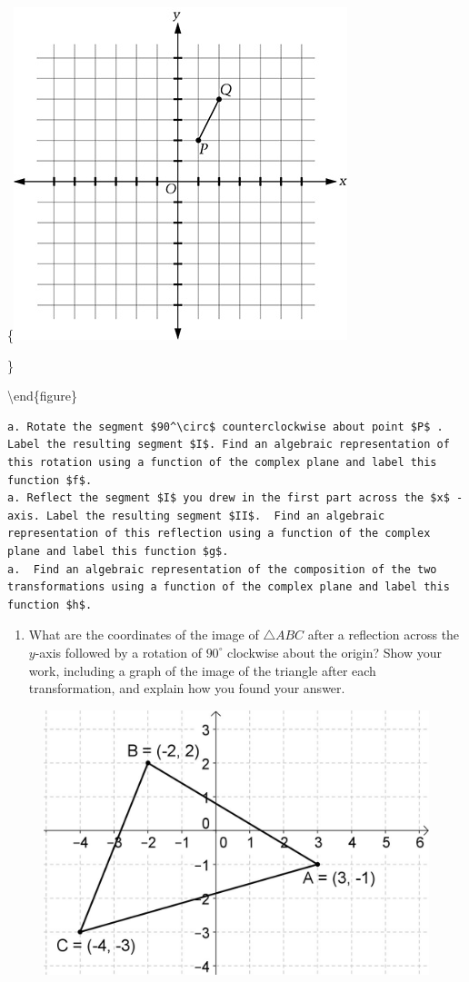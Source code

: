\documentclass[
]{book}
\providecommand{\tightlist}{%
  \setlength{\itemsep}{0pt}\setlength{\parskip}{0pt}}
\theoremstyle{definition}
\theoremstyle{definition}
\theoremstyle{definition}
\theoremstyle{definition}
\theoremstyle{remark}
\begin{document}
\{\centering \includegraphics[width=0.35\linewidth]{images/transformgraph}

\}

\textbackslash end\{figure\}

\begin{verbatim}
a. Rotate the segment $90^\circ$ counterclockwise about point $P$ . Label the resulting segment $I$. Find an algebraic representation of this rotation using a function of the complex plane and label this function $f$.
a. Reflect the segment $I$ you drew in the first part across the $x$ -axis. Label the resulting segment $II$.  Find an algebraic representation of this reflection using a function of the complex plane and label this function $g$.
a.  Find an algebraic representation of the composition of the two transformations using a function of the complex plane and label this function $h$.
\end{verbatim}

\begin{enumerate}
\def\labelenumi{\arabic{enumi}.}
\tightlist
\item
  What are the coordinates of the image of \(\triangle ABC\) after a reflection across the \(y\)-axis followed by a rotation of \(90^\circ\) clockwise about the origin? Show your work, including a graph of the image of the triangle after each transformation, and explain how you found your answer.
\end{enumerate}

\begin{figure}

{\centering \includegraphics[width=0.35\linewidth]{images/Transformation_Triangle2} 

}

\end{figure}
\end{document}
